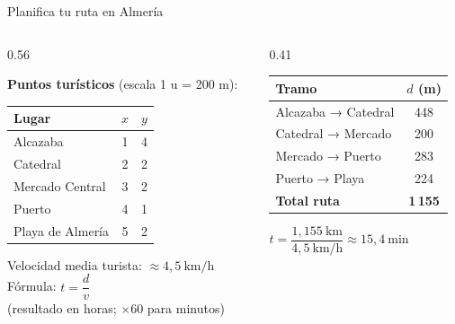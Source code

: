 \documentclass[aspectratio=169, 10pt, spanish]{beamer}
\begin{document}
\begin{frame}{Planifica tu ruta en Almería}
  \begin{columns}[T]
    \begin{column}{0.56\textwidth}
      \begin{ejemplobox}
        \AlmFontSmall
        \textbf{Puntos turísticos} (escala 1 u = 200 m):
        \begin{center}
        \begin{tabular}{lcc}
          \toprule
          Lugar & $x$ & $y$\\
          \midrule
          Alcazaba         & 1 & 4\\
          Catedral         & 2 & 2\\
          Mercado Central  & 3 & 2\\
          Puerto           & 4 & 1\\
          Playa de Almería & 5 & 2\\
          \bottomrule
        \end{tabular}
        \end{center}
      \end{ejemplobox}
      \vspace{4pt}
      \begin{notabox}
        \AlmFontFootnote
        Velocidad media turista: $\approx 4{,}5\ \text{km/h}$\\
        Fórmula: $t = \dfrac{d}{v}$\\
        (resultado en horas; $\times 60$ para minutos)
      \end{notabox}
    \end{column}
    \begin{column}{0.41\textwidth}
      \begin{tabular}{lc}
        \toprule
        \textbf{Tramo} & $d$ (m)\\
        \midrule
        Alcazaba → Catedral  & 448\\
        Catedral → Mercado   & 200\\
        Mercado → Puerto     & 283\\
        Puerto → Playa       & 224\\
        \midrule
        \textbf{Total ruta}  & \textbf{1\,155}\\
        \bottomrule
      \end{tabular}
      \vspace{8pt}
      \begin{formulabox}[AlmVerde]
        $t = \dfrac{1{,}155\ \text{km}}{4{,}5\ \text{km/h}}
           \approx 15{,}4\ \text{min}$
      \end{formulabox}
    \end{column}
  \end{columns}
\end{frame}
\end{document}
